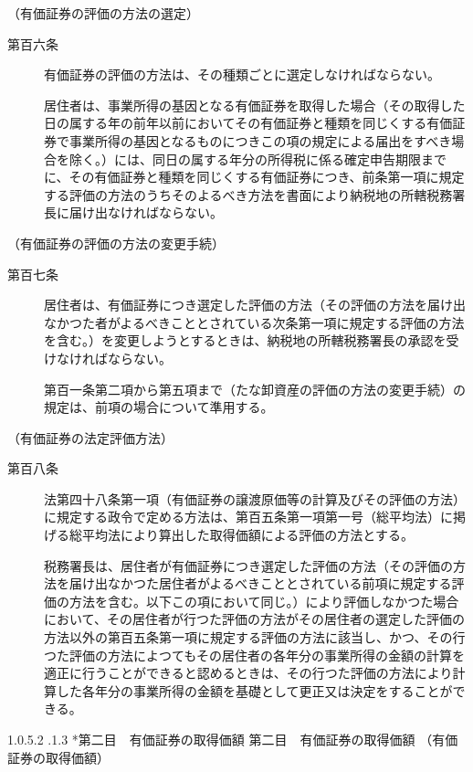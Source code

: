 \documentclass[twocolumn,a4j,10pt]{ltjtarticle}
\makeatletter
\newcommand{\subsubsubsection}{\@startsection{paragraph}{4}{\z@}%
  {1.0\Cvs \@plus.5\Cdp \@minus.2\Cdp}%
  {.1\Cvs \@plus.3\Cdp}%
  {\reset@font\sffamily\normalsize}
}
\makeatother
\begin{document}
\noindent\hspace{10pt}（有価証券の評価の方法の選定）
\begin{description}
\item[第百六条]有価証券の評価の方法は、その種類ごとに選定しなければならない。
\item[]居住者は、事業所得の基因となる有価証券を取得した場合（その取得した日の属する年の前年以前においてその有価証券と種類を同じくする有価証券で事業所得の基因となるものにつきこの項の規定による届出をすべき場合を除く。）には、同日の属する年分の所得税に係る確定申告期限までに、その有価証券と種類を同じくする有価証券につき、前条第一項に規定する評価の方法のうちそのよるべき方法を書面により納税地の所轄税務署長に届け出なければならない。
\end{description}
\noindent\hspace{10pt}（有価証券の評価の方法の変更手続）
\begin{description}
\item[第百七条]居住者は、有価証券につき選定した評価の方法（その評価の方法を届け出なかつた者がよるべきこととされている次条第一項に規定する評価の方法を含む。）を変更しようとするときは、納税地の所轄税務署長の承認を受けなければならない。
\item[]第百一条第二項から第五項まで（たな卸資産の評価の方法の変更手続）の規定は、前項の場合について準用する。
\end{description}
\noindent\hspace{10pt}（有価証券の法定評価方法）
\begin{description}
\item[第百八条]法第四十八条第一項（有価証券の譲渡原価等の計算及びその評価の方法）に規定する政令で定める方法は、第百五条第一項第一号（総平均法）に掲げる総平均法により算出した取得価額による評価の方法とする。
\item[]税務署長は、居住者が有価証券につき選定した評価の方法（その評価の方法を届け出なかつた居住者がよるべきこととされている前項に規定する評価の方法を含む。以下この項において同じ。）により評価しなかつた場合において、その居住者が行つた評価の方法がその居住者の選定した評価の方法以外の第百五条第一項に規定する評価の方法に該当し、かつ、その行つた評価の方法によつてもその居住者の各年分の事業所得の金額の計算を適正に行うことができると認めるときは、その行つた評価の方法により計算した各年分の事業所得の金額を基礎として更正又は決定をすることができる。
\end{description}
\subsubsubsection*{第二目　有価証券の取得価額}
{第二目　有価証券の取得価額}
\noindent\hspace{10pt}（有価証券の取得価額）
\end{document}

